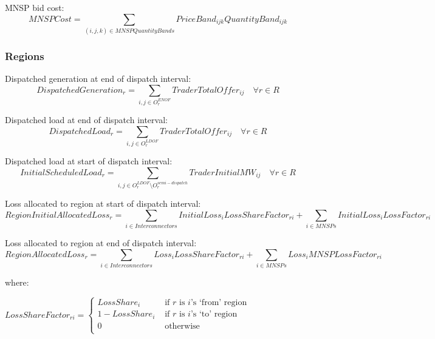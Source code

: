 \documentclass{article}
\begin{document}
MNSP bid cost:
\begin{equation}
MNSPCost =\sum\limits_{(i,j,k) \in MNSPQuantityBands} PriceBand_{ijk} QuantityBand_{ijk}
\end{equation}

\subsubsection{Regions}
Dispatched generation at end of dispatch interval:
\begin{equation}
	DispatchedGeneration_{r} = \sum\limits_{i,j \in O^{ENOF}_{r}} TraderTotalOffer_{ij} \quad\forall r \in R
\end{equation}

Dispatched load at end of dispatch interval:
\begin{equation}
DispatchedLoad_{r} = \sum\limits_{i,j \in O^{LDOF}_{r}} TraderTotalOffer_{ij} \quad\forall r \in R
\end{equation}


Dispatched load at start of dispatch interval:
\begin{equation}
InitialScheduledLoad_{r} = \sum\limits_{i,j \in O^{LDOF}_{r} \setminus O^{semi-dispatch}_{r}} TraderInitialMW_{ij} \quad\forall r \in R
\end{equation}

Loss allocated to region at start of dispatch interval:
\begin{equation}
	RegionInitialAllocatedLoss_{r} = \sum\limits_{i \in Interconnectors} InitialLoss_{i} LossShareFactor_{ri} + \sum\limits_{i \in MNSPs} InitialLoss_{i} LossFactor_{ri}
\end{equation}

Loss allocated to region at end of dispatch interval:
\begin{equation}
RegionAllocatedLoss_{r} = \sum\limits_{i \in Interconnectors} Loss_{i} LossShareFactor_{ri} + \sum\limits_{i \in MNSPs} Loss_{i} MNSPLossFactor_{ri}
\end{equation}

where:

$LossShareFactor_{ri}=
\begin{cases}
LossShare_{i} &\textrm{ if $r$ is $i$'s `from' region} \\
1 - LossShare_{i} &\textrm{ if $r$ is $i$'s `to' region} \\
0 &\textrm{ otherwise} \\
\end{cases}$
\end{document}
